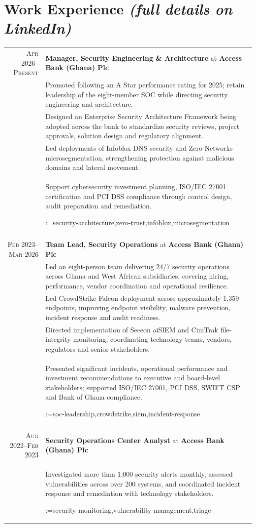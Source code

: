 \documentclass[a4paper,11pt]{article}
\makeatletter
\newcommand{\sotag}[1]{\tikz[baseline]{\node[anchor=base, rounded corners=0.5ex, text height=1.5ex, text depth=.25ex, fill=tagbg, draw=tagbg, text=tagtxt] {#1};}}
\newcommand{\sotagrow}[1]{\par\vspace{4pt}\noindent\@for\sotagitem:=#1\do{\sotag{\sotagitem} }\\}
\newcommand{\job}[2]{\large\sffamily \textbf{#1} at \textbf{#2}\rule[-0.45em]{0pt}{1.45em}}
\newcommand{\sep}{\multicolumn{2}{c}{}\\}
\makeatother
\begin{document}
\section{Work Experience \hfill{\normalfont\footnotesize\itshape (full details on LinkedIn)}}
\begin{longtable}{r|p{}}
\textsc{Apr 2026--Present} & \job{Manager, Security Engineering \& Architecture}{Access Bank (Ghana) Plc} \\
& Promoted following an A Star performance rating for 2025; retain leadership of the eight-member SOC while directing security engineering and architecture.\\[6pt]
& Designed an Enterprise Security Architecture Framework being adopted across the bank to standardize security reviews, project approvals, solution design and regulatory alignment.\\[6pt]
& Led deployments of Infoblox DNS security and Zero Networks microsegmentation, strengthening protection against malicious domains and lateral movement.\\[6pt]
& Support cybersecurity investment planning, ISO/IEC 27001 certification and PCI DSS compliance through control design, audit preparation and remediation.\sotagrow{security-architecture,zero-trust,infoblox,microsegmentation}
\sep
\textsc{Feb 2023--Mar 2026} & \job{Team Lead, Security Operations}{Access Bank (Ghana) Plc} \\
& Led an eight-person team delivering 24/7 security operations across Ghana and West African subsidiaries, covering hiring, performance, vendor coordination and operational resilience.\\[6pt]
& Led CrowdStrike Falcon deployment across approximately 1,359 endpoints, improving endpoint visibility, malware prevention, incident response and audit readiness.\\[6pt]
& Directed implementation of Seceon aiSIEM and CimTrak file-integrity monitoring, coordinating technology teams, vendors, regulators and senior stakeholders.\\[6pt]
& Presented significant incidents, operational performance and investment recommendations to executive and board-level stakeholders; supported ISO/IEC 27001, PCI DSS, SWIFT CSP and Bank of Ghana compliance.\sotagrow{soc-leadership,crowdstrike,siem,incident-response}
\sep
\textsc{Aug 2022--Feb 2023} & \job{Security Operations Center Analyst}{Access Bank (Ghana) Plc} \\
& Investigated more than 1,000 security alerts monthly, assessed vulnerabilities across over 200 systems, and coordinated incident response and remediation with technology stakeholders.\sotagrow{security-monitoring,vulnerability-management,triage}
\end{longtable}
\end{document}

